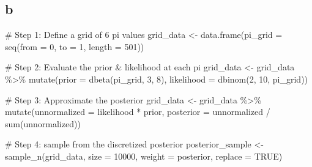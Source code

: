 \documentclass[
  letterpaper,
  DIV=11,
  numbers=noendperiod]{scrartcl}
\newenvironment{Shaded}{\begin{snugshade}}{\end{snugshade}}
\newcommand{\AttributeTok}[1]{\textcolor[rgb]{0.40,0.45,0.13}{#1}}
\newcommand{\CommentTok}[1]{\textcolor[rgb]{0.37,0.37,0.37}{#1}}
\newcommand{\ConstantTok}[1]{\textcolor[rgb]{0.56,0.35,0.01}{#1}}
\newcommand{\DecValTok}[1]{\textcolor[rgb]{0.68,0.00,0.00}{#1}}
\newcommand{\FunctionTok}[1]{\textcolor[rgb]{0.28,0.35,0.67}{#1}}
\newcommand{\NormalTok}[1]{\textcolor[rgb]{0.00,0.23,0.31}{#1}}
\newcommand{\OtherTok}[1]{\textcolor[rgb]{0.00,0.23,0.31}{#1}}
\newcommand{\SpecialCharTok}[1]{\textcolor[rgb]{0.37,0.37,0.37}{#1}}
\begin{document}
\hypertarget{b-4}{%
\subsection{b}\label{b-4}}

\begin{Shaded}
\begin{Highlighting}[]
\CommentTok{\# Step 1: Define a grid of 6 pi values}
\NormalTok{grid\_data }\OtherTok{\textless{}{-}} \FunctionTok{data.frame}\NormalTok{(}\AttributeTok{pi\_grid =} \FunctionTok{seq}\NormalTok{(}\AttributeTok{from =} \DecValTok{0}\NormalTok{, }\AttributeTok{to =} \DecValTok{1}\NormalTok{, }
                                      \AttributeTok{length =} \DecValTok{501}\NormalTok{))}

\CommentTok{\# Step 2: Evaluate the prior \& likelihood at each pi}
\NormalTok{grid\_data }\OtherTok{\textless{}{-}}\NormalTok{ grid\_data }\SpecialCharTok{\%\textgreater{}\%} 
  \FunctionTok{mutate}\NormalTok{(}\AttributeTok{prior =} \FunctionTok{dbeta}\NormalTok{(pi\_grid, }\DecValTok{3}\NormalTok{, }\DecValTok{8}\NormalTok{),}
         \AttributeTok{likelihood =} \FunctionTok{dbinom}\NormalTok{(}\DecValTok{2}\NormalTok{, }\DecValTok{10}\NormalTok{, pi\_grid))}

\CommentTok{\# Step 3: Approximate the posterior}
\NormalTok{grid\_data }\OtherTok{\textless{}{-}}\NormalTok{ grid\_data }\SpecialCharTok{\%\textgreater{}\%} 
  \FunctionTok{mutate}\NormalTok{(}\AttributeTok{unnormalized =}\NormalTok{ likelihood }\SpecialCharTok{*}\NormalTok{ prior,}
         \AttributeTok{posterior =}\NormalTok{ unnormalized }\SpecialCharTok{/} \FunctionTok{sum}\NormalTok{(unnormalized))}

\CommentTok{\# Step 4: sample from the discretized posterior}
\NormalTok{posterior\_sample }\OtherTok{\textless{}{-}} \FunctionTok{sample\_n}\NormalTok{(grid\_data, }
                             \AttributeTok{size =} \DecValTok{10000}\NormalTok{, }
                             \AttributeTok{weight =}\NormalTok{ posterior, }
                             \AttributeTok{replace =} \ConstantTok{TRUE}\NormalTok{)}


\end{Highlighting}
\end{Shaded}
\end{document}
